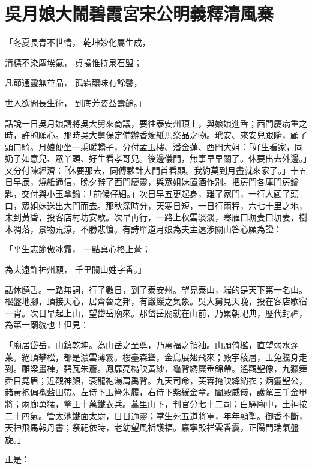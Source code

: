 %

\chapter{吳月娘大鬧碧霞宮\KG 宋公明義釋清風寨}

「冬夏長青不世情，  乾坤妙化屬生成，

清標不染塵埃氣，  貞操惟持泉石盟；

凡節通靈無並品，  孤霜釀味有餘馨，

世人欲問長生術，  到底芳姿益壽齡。」

話說一日吳月娘請將吳大舅來商議，要往泰安州頂上，與娘娘進香；西門慶病重之時，許的願心。那時吳大舅保定備辦香燭紙馬祭品之物。玳安、來安兒跟隨，顧了頭口騎。月娘便坐一乘暖轎子，分付孟玉樓、潘金蓮、西門大姐：「好生看家，同奶子如意兒、眾丫頭、好生看孝哥兒。後邊儀門，無事早早關了。休要出去外邊。」又分付陳經濟：「休要那去，同傅夥計大門首看顧。我約莫到月盡就來家了。」十五日早辰，燒紙通信，晚夕辭了西門慶靈，與眾姐妹置酒作別。把房門各庫門房鑰匙，交付與小玉拿鑰：「前候仔細。」次日早五更起身，離了家門，一行人顧了頭口，眾姐妹送出大門而去。那秋深時分，天寒日短，一日行兩程，六七十里之地，未到黃昏，投客店村坊安歇。次早再行，一路上秋雲淡淡，寒雁口塀妻口塀妻，樹木凋落，景物荒涼，不勝悲愴。有詩單道月娘為夫主遠涉關山答心願為證：

「平生志節傲冰霜，  一點真心格上蒼；

為夫遠許神州願，  千里關山姓字香。」

話休饒舌。一路無詞，行了數日，到了泰安州。望見泰山，端的是天下第一名山。根盤地腳，頂接天心，居齊魯之邦，有巖巖之氣象。吳大舅見天晚，投在客店歇宿一宵。次日早起上山，望岱岳廟來。那岱岳廟就在山前，乃累朝祀典，歷代封禪，為第一廟貌也！但見：

「廟居岱岳，山鎮乾坤。為山岳之至尊，乃萬福之領袖。山頭倚檻，直望弱水蓬萊。絕頂攀松，都是濃雲薄霧。樓臺森聳，金烏展翅飛來；殿宇稜層，玉兔騰身走到。雕梁畫棟，碧瓦朱簷。鳳扉亮槅映黃紗，龜背綉簾垂錦帶。遙觀聖像，九獵舞舜目堯眉；近觀神顏，袞龍袍湯肩禹背。九天司命，芙蓉掩映絳綃衣；炳靈聖公，赭黃袍偏襯藍田帶。左侍下玉簪朱履，右侍下紫綬金章。闔殿威儀，護駕三千金甲將；兩廊勇猛，擎王十萬鐵衣兵。蒿里山下，判官分七十二司；白驛廟中，土神按二十四氣。管太池鐵面太尉，日日通靈；掌生死五道將軍，年年顯聖。御香不斷，天神飛馬報丹書；祭祀依時，老幼望風祈護福。嘉寧殿祥雲香靄，正陽門瑞氣盤旋。」

正是：

